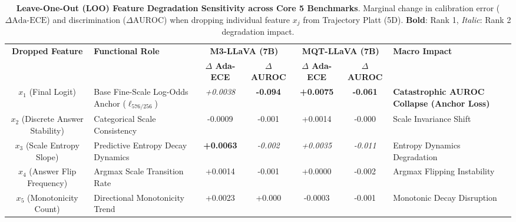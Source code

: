 \begin{table}[t]
\setlength{\tabcolsep}{4pt}
\renewcommand{\arraystretch}{1.05}
\centering
\small
\begin{tabular}{clccccl}
\toprule
\multirow{2}{*}{\textbf{Dropped Feature}} & \multirow{2}{*}{\textbf{Functional Role}} & \multicolumn{2}{c}{\textbf{M3-LLaVA (7B)}} & \multicolumn{2}{c}{\textbf{MQT-LLaVA (7B)}} & \multirow{2}{*}{\textbf{Macro Impact}} \\
\cmidrule(lr){3-4} \cmidrule(lr){5-6}
& & \textbf{$\Delta$ Ada-ECE} & \textbf{$\Delta$ AUROC} & \textbf{$\Delta$ Ada-ECE} & \textbf{$\Delta$ AUROC} & \\
\midrule
$x_{1}$ (Final Logit) & Base Fine-Scale Log-Odds Anchor ($\ell_{576/256}$) & \textit{+0.0038} & \textbf{-0.094} & \textbf{+0.0075} & \textbf{-0.061} & \textbf{Catastrophic AUROC Collapse (Anchor Loss)} \\
$x_{2}$ (Discrete Answer Stability) & Categorical Scale Consistency & -0.0009 & -0.001 & +0.0014 & -0.000 & Scale Invariance Shift \\
$x_{3}$ (Scale Entropy Slope) & Predictive Entropy Decay Dynamics & \textbf{+0.0063} & \textit{-0.002} & \textit{+0.0035} & \textit{-0.011} & Entropy Dynamics Degradation \\
$x_{4}$ (Answer Flip Frequency) & Argmax Scale Transition Rate & +0.0014 & -0.001 & +0.0000 & -0.002 & Argmax Flipping Instability \\
$x_{5}$ (Monotonicity Count) & Directional Monotonicity Trend & +0.0023 & +0.000 & -0.0003 & -0.001 & Monotonic Decay Disruption \\
\bottomrule
\end{tabular}
\caption{\textbf{Leave-One-Out (LOO) Feature Degradation Sensitivity across Core 5 Benchmarks}. Marginal change in calibration error ($\Delta \text{Ada-ECE}$) and discrimination ($\Delta \text{AUROC}$) when dropping individual feature $x_j$ from Trajectory Platt (5D). \textbf{Bold}: Rank 1, \textit{Italic}: Rank 2 degradation impact.}
\label{tab:ablation_5d_loo}
\end{table}
